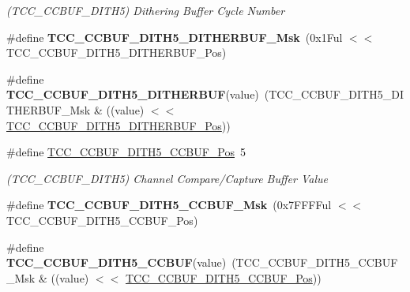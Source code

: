 \begin{DoxyCompactItemize}
\begin{DoxyCompactList}\small\item\em (T\+C\+C\+\_\+\+C\+C\+B\+U\+F\+\_\+\+D\+I\+T\+H5) Dithering Buffer Cycle Number \end{DoxyCompactList}\item 
\hypertarget{group___s_a_m_l21___t_c_c_ga6bd028c417d1fa77c32a65fda66e12f7}{}\#define {\bfseries T\+C\+C\+\_\+\+C\+C\+B\+U\+F\+\_\+\+D\+I\+T\+H5\+\_\+\+D\+I\+T\+H\+E\+R\+B\+U\+F\+\_\+\+Msk}~(0x1\+Ful $<$$<$ T\+C\+C\+\_\+\+C\+C\+B\+U\+F\+\_\+\+D\+I\+T\+H5\+\_\+\+D\+I\+T\+H\+E\+R\+B\+U\+F\+\_\+\+Pos)\label{group___s_a_m_l21___t_c_c_ga6bd028c417d1fa77c32a65fda66e12f7}

\item 
\hypertarget{group___s_a_m_l21___t_c_c_ga8940b7294d63f31c9c3aaf356b7ab859}{}\#define {\bfseries T\+C\+C\+\_\+\+C\+C\+B\+U\+F\+\_\+\+D\+I\+T\+H5\+\_\+\+D\+I\+T\+H\+E\+R\+B\+U\+F}(value)~(T\+C\+C\+\_\+\+C\+C\+B\+U\+F\+\_\+\+D\+I\+T\+H5\+\_\+\+D\+I\+T\+H\+E\+R\+B\+U\+F\+\_\+\+Msk \& ((value) $<$$<$ \hyperlink{group___s_a_m_l21___t_c_c_ga5325e0f965412c0dceb39f73fae14592}{T\+C\+C\+\_\+\+C\+C\+B\+U\+F\+\_\+\+D\+I\+T\+H5\+\_\+\+D\+I\+T\+H\+E\+R\+B\+U\+F\+\_\+\+Pos}))\label{group___s_a_m_l21___t_c_c_ga8940b7294d63f31c9c3aaf356b7ab859}

\item 
\hypertarget{group___s_a_m_l21___t_c_c_ga280788d376121bfda42b9572e5773bfb}{}\#define \hyperlink{group___s_a_m_l21___t_c_c_ga280788d376121bfda42b9572e5773bfb}{T\+C\+C\+\_\+\+C\+C\+B\+U\+F\+\_\+\+D\+I\+T\+H5\+\_\+\+C\+C\+B\+U\+F\+\_\+\+Pos}~5\label{group___s_a_m_l21___t_c_c_ga280788d376121bfda42b9572e5773bfb}

\begin{DoxyCompactList}\small\item\em (T\+C\+C\+\_\+\+C\+C\+B\+U\+F\+\_\+\+D\+I\+T\+H5) Channel Compare/\+Capture Buffer Value \end{DoxyCompactList}\item 
\hypertarget{group___s_a_m_l21___t_c_c_ga1dbf660dbc3c5772f4592fbe72d90f6b}{}\#define {\bfseries T\+C\+C\+\_\+\+C\+C\+B\+U\+F\+\_\+\+D\+I\+T\+H5\+\_\+\+C\+C\+B\+U\+F\+\_\+\+Msk}~(0x7\+F\+F\+F\+Ful $<$$<$ T\+C\+C\+\_\+\+C\+C\+B\+U\+F\+\_\+\+D\+I\+T\+H5\+\_\+\+C\+C\+B\+U\+F\+\_\+\+Pos)\label{group___s_a_m_l21___t_c_c_ga1dbf660dbc3c5772f4592fbe72d90f6b}

\item 
\hypertarget{group___s_a_m_l21___t_c_c_ga5b7483b4c8d1101be227c9e183267b88}{}\#define {\bfseries T\+C\+C\+\_\+\+C\+C\+B\+U\+F\+\_\+\+D\+I\+T\+H5\+\_\+\+C\+C\+B\+U\+F}(value)~(T\+C\+C\+\_\+\+C\+C\+B\+U\+F\+\_\+\+D\+I\+T\+H5\+\_\+\+C\+C\+B\+U\+F\+\_\+\+Msk \& ((value) $<$$<$ \hyperlink{group___s_a_m_l21___t_c_c_ga280788d376121bfda42b9572e5773bfb}{T\+C\+C\+\_\+\+C\+C\+B\+U\+F\+\_\+\+D\+I\+T\+H5\+\_\+\+C\+C\+B\+U\+F\+\_\+\+Pos}))\label{group___s_a_m_l21___t_c_c_ga5b7483b4c8d1101be227c9e183267b88}


\end{DoxyCompactItemize}
